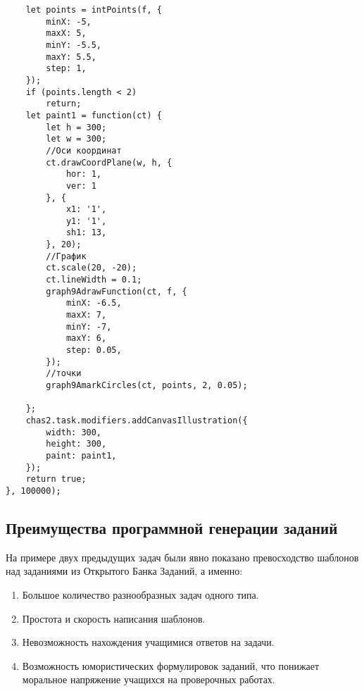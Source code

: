 \begin{enumerate}
\begin{lstlisting}
	let points = intPoints(f, {
		minX: -5,
		maxX: 5,
		minY: -5.5,
		maxY: 5.5,
		step: 1,
	});
	if (points.length < 2)
		return;
	let paint1 = function(ct) {
		let h = 300;
		let w = 300;
		//Оси координат
		ct.drawCoordPlane(w, h, {
			hor: 1,
			ver: 1
		}, {
			x1: '1',
			y1: '1',
			sh1: 13,
		}, 20);
		//График
		ct.scale(20, -20);
		ct.lineWidth = 0.1;
		graph9AdrawFunction(ct, f, {
			minX: -6.5,
			maxX: 7,
			minY: -7,
			maxY: 6,
			step: 0.05,
		});
		//точки
		graph9AmarkCircles(ct, points, 2, 0.05);

	};
	chas2.task.modifiers.addCanvasIllustration({
		width: 300,
		height: 300,
		paint: paint1,
	});
	return true;
}, 100000);
        \end{lstlisting}
\end{enumerate}
\subsection{Преимущества программной генерации заданий}
На примере двух предыдущих задач были явно показано превосходство шаблонов над заданиями из Открытого Банка Заданий, а именно:
\begin{enumerate}
    \item Большое количество разнообразных задач одного типа.
    \item Простота и скорость написания шаблонов.
    \item Невозможность нахождения учащимися ответов на задачи.
    \item Возможность юмористических формулировок заданий, что понижает моральное напряжение учащихся на проверочных работах.%
\end{enumerate}


